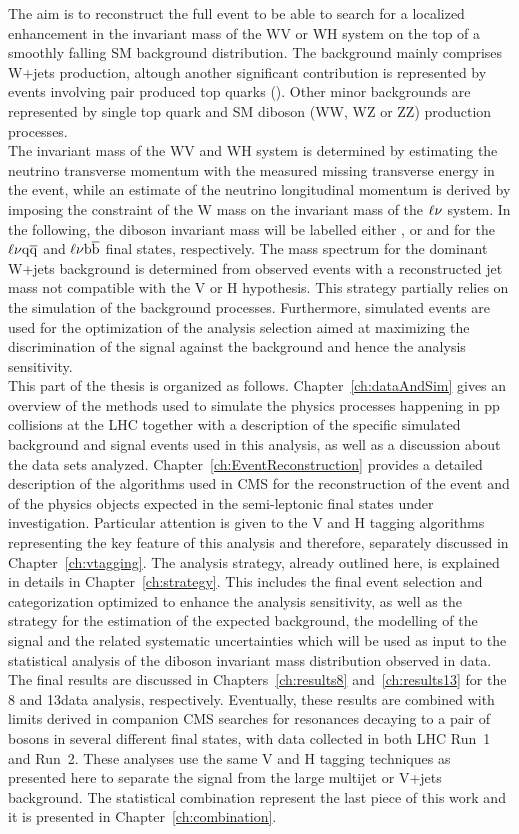 The aim is to reconstruct the full event to be able to search for a localized enhancement in the invariant mass of the WV or WH system
on the top of a smoothly falling SM background distribution.
The background mainly comprises W+jets production, altough another significant contribution is represented by 
events involving pair produced top quarks (\ttbar).
Other minor backgrounds are represented by single top quark and SM diboson (WW, WZ or ZZ) production processes.\\

The invariant mass of the WV and WH system is determined by estimating the neutrino transverse momentum with the measured missing transverse energy in the event,
while an estimate of the neutrino longitudinal momentum is derived by imposing the constraint of the W mass on the invariant mass of the $\ell\nu$ system.
In the following, the diboson invariant mass will be labelled either \mlvj, or \mWV and \mWH for the $\ell\nu\mathrm{q}\overline{\mathrm{q}}$ and $\ell\nu{\mathrm{b}\overline{\mathrm{b}}}$ final states, respectively.
The mass spectrum for the dominant W+jets background is determined from observed events with a reconstructed jet mass not compatible with the V or H hypothesis. 
This strategy partially relies on the simulation of the background processes.
Furthermore, simulated events are used for the optimization of the analysis selection aimed at maximizing the discrimination of the signal against the background and hence the analysis sensitivity.\\

This part of the thesis is organized as follows.
Chapter~\ref{ch:dataAndSim} gives an overview of the methods used to simulate the physics processes happening in pp collisions at the LHC
together with a description of the specific simulated background and signal events used in this analysis, as well as a discussion about the data sets analyzed.
Chapter~\ref{ch:EventReconstruction} provides a detailed description of the algorithms used in CMS for the reconstruction of the event and of the physics objects expected in the semi-leptonic final states under investigation.
Particular attention is given to the V and H tagging algorithms representing the key feature of this analysis and therefore, separately discussed in Chapter~\ref{ch:vtagging}.
The analysis strategy, already outlined here, is explained in details in Chapter~\ref{ch:strategy}.
This includes the final event selection and categorization optimized to enhance the analysis sensitivity,
as well as the strategy for the estimation of the expected background, the modelling of the signal and the related systematic uncertainties
which will be used as input to the statistical analysis of the diboson invariant mass distribution observed in data.
The final results are discussed in Chapters~\ref{ch:results8} and~\ref{ch:results13} for the 8 and 13\TeV data analysis, respectively. 
Eventually, these results are combined with limits derived in companion CMS searches for resonances decaying to a pair of bosons in several different final states, with data collected in both LHC Run~1 and Run~2.
These analyses use the same V and H tagging techniques as presented here to separate the signal from the large multijet or V+jets background.
The statistical combination represent the last piece of this work and it is presented in Chapter~\ref{ch:combination}.